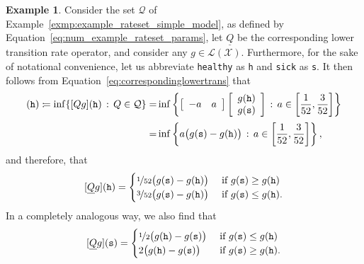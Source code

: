 \documentclass[10pt,a4paper]{paper}
\theoremstyle{definition}
\newtheorem{exmp}{Example}%
\newcommand{\states}{\mathcal{X}}
\newcommand{\gambles}{\mathcal{L}}
\newcommand{\gamblesX}{\gambles(\states)}
\newcommand{\rateset}{\mathcal{Q}}
\newcommand{\lrate}{\underline{Q}}
\newcommand{\coloneqq}{:\!=}
\begin{document}
\begin{exmp}\label{exmp:numerical_lrate}
Consider the set $\rateset$ of Example~\ref{exmp:example_rateset_simple_model}, as defined by Equation~\eqref{eq:num_example_rateset_params}, let $\lrate$ be the corresponding lower transition rate operator, and consider any $g\in\gamblesX$. Furthermore, for the sake of notational convenience, let us abbreviate {\tt healthy} as {\tt h} and {\tt sick} as {\tt s}. It then follows from Equation~\eqref{eq:correspondinglowertrans} that
\begin{align*}
[\lrate g](\text{{\tt h}})
\coloneqq
\inf\{[Qg](\text{{\tt h}})\,:\,Q\in\rateset\}
=&
\inf\left\{\left[\begin{array}{rr}-a & a \end{array}\right]\left[\begin{array}{l} g(\text{{\tt h}}) \\ g(\text{{\tt s}}) \end{array}\right]\,:\,a\in\left[\frac{1}{52}, \frac{3}{52} \right]\right\} \\[2pt]
=&\inf\left\{a\big(g(\text{{\tt s}})-g(\text{{\tt h}})\big)\,:\,a\in\left[\frac{1}{52}, \frac{3}{52} \right]\right\},
\end{align*}
and therefore, that
\begin{equation}\label{eq:lratehealthexample:h}
[\lrate g](\text{{\tt h}})
=
\begin{cases}
\nicefrac{1}{52}\big(g(\text{{\tt s}})-g(\text{{\tt h}})\big)
&\text{ if $g(\text{{\tt s}})\geq g(\text{{\tt h}})$}\\
\nicefrac{3}{52}\big(g(\text{{\tt s}})-g(\text{{\tt h}})\big)
&\text{ if $g(\text{{\tt s}})\leq g(\text{{\tt h}})$}.
\end{cases}
\end{equation}
In a completely analogous way, we also find that
\begin{equation}\label{eq:lratehealthexample:s}
[\lrate g](\text{{\tt s}})
=
\begin{cases}
\nicefrac{1}{2}\big(g(\text{{\tt h}})-g(\text{{\tt s}})\big)
&\text{ if $g(\text{{\tt s}})\leq g(\text{{\tt h}})$}\\
2\big(g(\text{{\tt h}})-g(\text{{\tt s}})\big)
&\text{ if $g(\text{{\tt s}})\geq g(\text{{\tt h}})$}.
\end{cases}
\end{equation}

\end{exmp}
\end{document}
